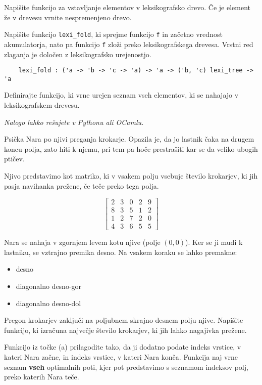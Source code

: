 \documentclass[arhiv]{../izpit}
\begin{document}
\podnaloga 
Napišite funkcijo za vstavljanje elementov v leksikografsko drevo. Če je element že v drevesu vrnite nespremenjeno drevo.

\podnaloga 
Napišite funkcijo \verb|lexi_fold|, ki sprejme funkcijo \verb|f| in začetno vrednost akumulatorja, nato pa funkcijo \verb|f| zloži preko leksikografskega drevesa. Vrstni red zlaganja je določen z leksikografsko urejenostjo.

\begin{verbatim}
    lexi_fold : ('a -> 'b -> 'c -> 'a) -> 'a -> ('b, 'c) lexi_tree -> 'a
\end{verbatim}

\podnaloga 
Definirajte funkcijo, ki vrne urejen seznam vseh elementov, ki se nahajajo v leksikografskem drevesu.



\naloga
\emph{Nalogo lahko rešujete v Pythonu ali OCamlu.}

Psička Nara po njivi preganja krokarje. Opazila je, da jo lastnik čaka na drugem koncu polja, zato hiti k njemu, pri tem pa hoče prestrašiti kar se da veliko ubogih ptičev.

Njivo predstavimo kot matriko, ki v vsakem polju vsebuje število krokarjev, ki jih pasja navihanka prežene, če teče preko tega polja.

\[
\begin{bmatrix}
2& 3& 0& 2& 9\\
8& 3& 5& 1& 2\\
1& 2& 7& 2& 0\\
4& 3& 6& 5& 5
\end{bmatrix}
\]

\podnaloga
Nara se nahaja v zgornjem levem kotu njive (polje $(0, 0)$). Ker se ji mudi k lastniku, se vztrajno premika desno. Na vsakem koraku se lahko premakne:
\begin{itemize}
\item desno
\item diagonalno desno-gor
\item diagonalno desno-dol
\end{itemize}

Pregon krokarjev zaključi na poljubnem skrajno desnem polju njive. Napišite funkcijo, ki izračuna največje število krokarjev, ki jih lahko nagajivka prežene.

\podnaloga
Funkcijo iz točke (a) prilagodite tako, da ji dodatno podate indeks vrstice, v kateri Nara začne, in indeks vrstice, v kateri Nara konča. Funkcija naj vrne seznam \textbf{vseh} optimalnih poti, kjer pot predstavimo s seznamom indeksov polj, preko katerih Nara teče.
\end{document}
